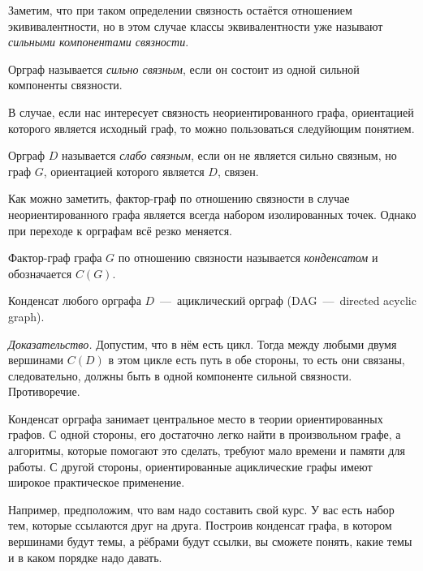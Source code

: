 	Заметим, что при таком определении связность остаётся отношением экививалентности, но в этом случае классы эквивалентности уже называют \emph{сильными компонентами связности}.
	
\begin{definition}
	Орграф называется \emph{сильно связным}, если он состоит из одной сильной компоненты связности. 
\end{definition}

	В случае, если нас интересует связность неориентированного графа, ориентацией которого является исходный граф, то можно пользоваться следуйющим понятием.

\begin{definition}
	Орграф $D$ называется \emph{слабо связным}, если он не является сильно связным, но граф $G$, ориентацией которого является $D$, связен.
\end{definition}

	Как можно заметить, фактор-граф по отношению связности в случае неориентированного графа является всегда набором изолированных точек. Однако при переходе к орграфам всё резко меняется.

\begin{definition}
	Фактор-граф графа $G$ по отношению связности называется \emph{конденсатом} и обозначается $C(G)$.
\end{definition}

\begin{theorem}
	Конденсат любого орграфа $D$~---~ациклический орграф (DAG~---~directed acyclic graph).
	
	\emph{Доказательство.} Допустим, что в нём есть цикл. Тогда между любыми двумя вершинами $C(D)$ в этом цикле есть путь в обе стороны, то есть они связаны, следовательно, должны быть в одной компоненте сильной связности. Противоречие.
\end{theorem}

	Конденсат орграфа занимает центральное место в теории ориентированных графов. С одной стороны, его достаточно легко найти в произвольном графе, а алгоритмы, которые помогают это сделать, требуют мало времени и памяти для работы. С другой стороны, ориентированные ациклические графы имеют широкое практическое применение. 
	
	Например, предположим, что вам надо составить свой курс. У вас есть набор тем, которые ссылаются друг на друга. Построив конденсат графа, в котором вершинами будут темы, а рёбрами будут ссылки, вы сможете понять, какие темы и в каком порядке надо давать.

